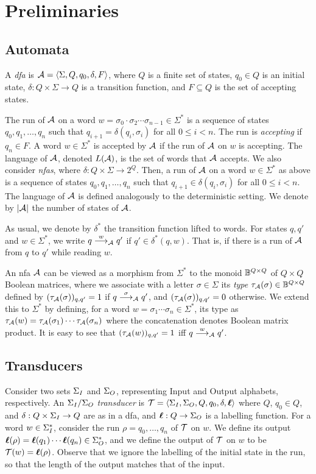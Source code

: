 \chapter{Preliminaries}
\label{chap:prelims}

\section*{Automata}
A \emph{\gls{dfa}} is $\mathcal{A}=\left< \Sigma,Q,q_0,\delta,F\right>$, where $Q$ is a finite set of states, $q_0 \in Q$ is an initial state, $\delta: Q\times \Sigma \to Q$ is a transition function, and $F\subseteq Q$ is the set of accepting states. 

The run of $\mathcal{A}$ on a word $w=\sigma_0 \cdot \sigma_2 \cdots \sigma_{n-1}\in \Sigma^*$ is a sequence of states $q_0,q_1,\ldots,q_n$ such that $q_{i+1} = \delta(q_i,\sigma_{i})$ for all $0\le i<n$. 
The run is \emph{accepting} if $q_n\in F$. A word $w \in \Sigma^*$ is accepted by $\mathcal{A}$ if the run of $\mathcal{A}$ on $w$ is accepting. The language of $\mathcal{A}$, denoted $L(\mathcal{A})$, is the set of words that $\mathcal{A}$ accepts. 
We also consider \emph{\glspl{nfa}}, where $\delta:Q\times \Sigma\to 2^Q$. Then, a run of $\mathcal{A}$ on a word $w\in \Sigma^*$ as above is a sequence of states $q_0,q_1,\ldots,q_n$ such that $q_{i+1} \in \delta(q_i,\sigma_{i})$ for all $0\le i<n$. The language of $\mathcal{A}$ is defined analogously to the deterministic setting.
We denote by $|\mathcal{A}|$ the number of states of $\mathcal{A}$.

As usual, we denote by $\delta^*$ the transition function lifted to words.
For states $q,q'$ and $w\in \Sigma^*$, we write $q\stackrel{w}{\longrightarrow}_{\mathcal{A}}q'$ if $q'\in \delta^*(q,w)$. That is, if there is a run of $\mathcal{A}$ from $q$ to $q'$ while reading $w$.

An \gls{nfa} $\mathcal{A}$ can be viewed as a morphism from $\Sigma^*$ to the monoid $\mathbb{B}^{Q\times Q}$ of $Q\times Q$ Boolean matrices, where we associate with a letter $\sigma\in \Sigma$ its \emph{type} $\tau_{\mathcal{A}}(\sigma)\in \mathbb{B}^{Q\times Q}$ defined by $(\tau_{\mathcal{A}}(\sigma))_{q,q'}=1$ if $q\stackrel{\sigma}{\longrightarrow}_{\mathcal{A}}q'$, and $(\tau_{\mathcal{A}}(\sigma))_{q,q'}=0$ otherwise. We extend this to $\Sigma^*$ by defining, for a word $w=\sigma_1\cdots \sigma_n\in \Sigma^*$, its type as $\tau_{\mathcal{A}}(w)=\tau_{\mathcal{A}}(\sigma_1)\cdots \tau_{\mathcal{A}}(\sigma_n)$ where the concatenation denotes Boolean matrix product. It is easy to see that $(\tau_{\mathcal{A}}(w))_{q,q'}=1$ iff $q\stackrel{w}{\longrightarrow}_{\mathcal{A}}q'$.

\section*{Transducers}
Consider two sets $\Sigma_{I}$ and $\Sigma_{O}$, representing Input and Output alphabets, respectively. An \emph{$\Sigma_{I}/\Sigma_{O}$ transducer} is $\mathcal{T}=\left< \Sigma_{I},\Sigma_{O},Q,q_0,\delta,\boldsymbol{\ell}\right>$ where $Q$, $q_0\in Q$, and $\delta:Q\times \Sigma_{I}\to Q$ are as in a \gls{dfa}, and $\boldsymbol{\ell}:Q\to \Sigma_{O}$ is a labelling function. For a word $w\in \Sigma_{I}^*$, consider the run $\rho=q_0,\ldots,q_n$ of $\mathcal{T}$ on $w$. We define its output $\boldsymbol{\ell}(\rho)=\boldsymbol{\ell}(q_1)\cdots\boldsymbol{\ell}(q_n)\in \Sigma_{O}^*$, and we define the output of $\mathcal{T}$ on $w$ to be $\mathcal{T}(w)=\boldsymbol{\ell}(\rho)$. Observe that we ignore the labelling of the initial state in the run, so that the length of the output matches that of the input.

